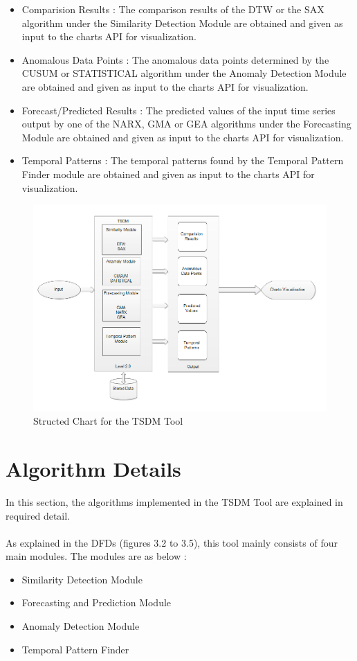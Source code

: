 \documentclass[12pt,a4paper]{report}
\begin{document}
\begin{itemize}
\item Comparision Results  : The comparison results of the DTW or the SAX algorithm under the Similarity Detection Module are obtained and given as input to the charts API for visualization.
\item Anomalous Data Points  : The anomalous data points determined by the CUSUM or STATISTICAL algorithm under the Anomaly Detection Module are obtained and given as input to the charts API for visualization.
\item Forecast/Predicted Results  : The predicted values of the input time series output by one of the NARX, GMA or GEA algorithms under the Forecasting Module are obtained and given as input to the charts API for visualization.
\item Temporal Patterns  : The temporal patterns found by the Temporal Pattern Finder module are obtained and given as input to the charts API for visualization.
\end{itemize}
\begin{figure}[h!]
	\centering
		\includegraphics[scale=0.7]{screenshots/structured_chart.png}
		\caption{Structed Chart for the TSDM Tool }
\end{figure}

\section{Algorithm Details}
In this section, the algorithms implemented in the TSDM Tool are explained in required detail.

\paragraph{} As explained in the DFDs (figures 3.2 to 3.5), this tool mainly consists of four main modules.
The modules are as below :
\begin{itemize}
\item Similarity Detection Module
\item Forecasting and Prediction Module
\item Anomaly Detection Module
\item Temporal Pattern Finder 
\end{itemize}
\end{document}

